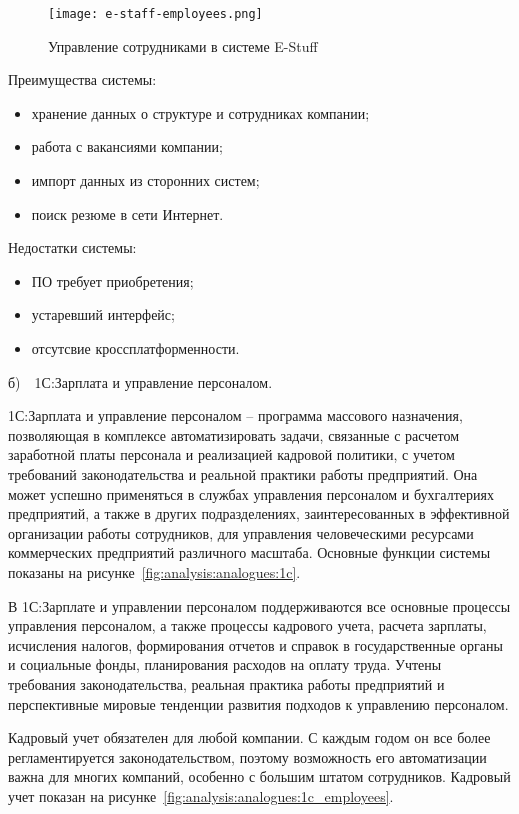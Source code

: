 \begin{figure}[!h]
	\centering
	\texttt{[image: e-staff-employees.png]} 
	\caption{Управление сотрудниками в системе E-Stuff}
	\label{fig:analysis:analogues:e-staff-employees}
\end{figure}

Преимущества системы:
\begin{itemize}
	\item хранение данных о структуре и сотрудниках компании;
	\item работа с вакансиями компании;
	\item импорт данных из сторонних систем;
	\item поиск резюме в сети Интернет.
\end{itemize}

Недостатки системы:
\begin{itemize}
	\item ПО требует приобретения;
	\item устаревший интерфейс;
	\item отсутсвие кроссплатформенности.
\end{itemize}

\pagebreak
б)~~1С:Зарплата и управление персоналом.

1С:Зарплата и управление персоналом -- программа массового назначения, позволяющая в комплексе автоматизировать
задачи, связанные с расчетом заработной платы персонала и реализацией кадровой политики, с учетом требований
законодательства и реальной практики работы предприятий. Она может успешно применяться в службах управления персоналом
и бухгалтериях предприятий, а также в других подразделениях, заинтересованных в эффективной организации работы
сотрудников, для управления человеческими ресурсами коммерческих предприятий различного масштаба.
Основные функции системы показаны на рисунке~\ref{fig:analysis:analogues:1c}.

В 1С:Зарплате и управлении персоналом поддерживаются все основные процессы управления персоналом, а также процессы
кадрового учета, расчета зарплаты, исчисления налогов, формирования отчетов и справок в государственные органы и
социальные фонды, планирования расходов на оплату труда. Учтены требования законодательства, реальная практика работы
предприятий и перспективные мировые тенденции развития подходов к управлению персоналом.

Кадровый учет обязателен для любой компании. С каждым годом он все более регламентируется законодательством, поэтому
возможность его автоматизации важна для многих компаний, особенно с большим штатом сотрудников.
Кадровый учет показан на рисунке~\ref{fig:analysis:analogues:1c_employees}.

